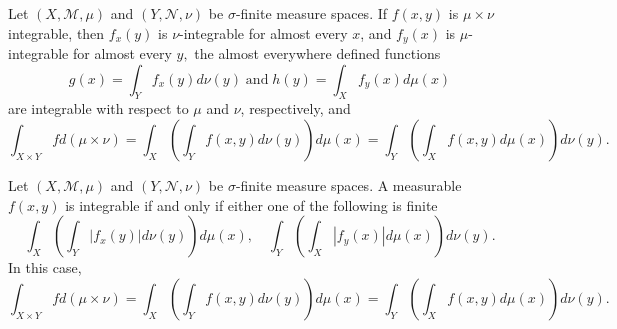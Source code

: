 \documentclass[class=book, crop=false]{standalone}
\begin{document}
        \begin{theorem}
            Let $(X, \mathscr{M}, \mu)$ and $(Y, \mathscr{N}, \nu)$ be $\sigma$-finite measure spaces. If $f(x, y)$ is $\mu \times \nu$ integrable, then $f_x(y)$ is $\nu$-integrable for almost every $x$, and $f_y(x)$ is $\mu$-integrable for almost every $y,$ the almost everywhere defined functions
            \begin{equation*}
                g(x) = \int_Y f_x(y) d\nu(y) \;\text{and}\; h(y) = \int_X f_y(x) d\mu(x)
            \end{equation*}
            are integrable with respect to $\mu$ and $\nu$, respectively, and
            \begin{equation*}
                \int_{X \times Y} f d(\mu \times \nu) = \int_X \left(\int_Y f(x, y) d\nu(y)\right) d\mu(x) = \int_Y \left(\int_X f(x, y) d\mu(x)\right) d\nu(y).
            \end{equation*}
        \end{theorem}

        \begin{theorem}
            Let $(X, \mathscr{M}, \mu)$ and $(Y, \mathscr{N}, \nu)$ be $\sigma$-finite measure spaces. A measurable $f(x, y)$ is integrable if and only if either one of the following is finite
            \begin{equation*}
                \int_X \left(\int_Y |f_x(y)| d\nu(y)\right) d\mu(x), \quad \int_Y \left(\int_X |f_y(x)| d\mu(x)\right) d\nu(y).
            \end{equation*}
            In this case,
            \begin{equation*}
                \int_{X \times Y} f d(\mu \times \nu) = \int_X \left(\int_Y f(x, y) d\nu(y)\right) d\mu(x) = \int_Y \left(\int_X f(x, y) d\mu(x)\right) d\nu(y).
            \end{equation*}
        \end{theorem}
        
\end{document}
